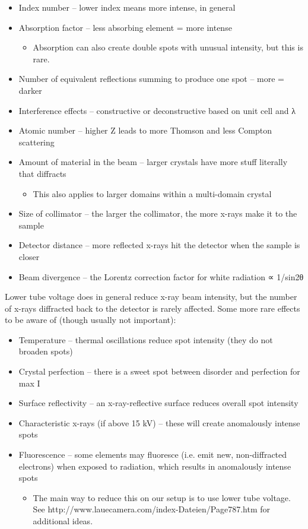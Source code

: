 \begin{itemize}
    \item Index number – lower index means more intense, in general
    \item Absorption factor – less absorbing element = more intense
    \begin{itemize}
        \item Absorption can also create double spots with unusual intensity, but this is rare.
        \end{itemize}
    \item Number of equivalent reflections summing to produce one spot – more = darker
    \item Interference effects – constructive or deconstructive based on unit cell and λ
    \item Atomic number – higher Z leads to more Thomson and less Compton scattering
    \item Amount of material in the beam – larger crystals have more stuff literally that diffracts
    \begin{itemize}
        \item This also applies to larger domains within a multi-domain crystal
        \end{itemize}
    \item Size of collimator – the larger the collimator, the more x-rays make it to the sample
    \item Detector distance – more reflected x-rays hit the detector when the sample is closer
    \item Beam divergence – the Lorentz correction factor for white radiation ∝ 1/sin2θ
\end{itemize}
Lower tube voltage does in general reduce x-ray beam intensity, but the number of x-rays diffracted back to the detector is rarely affected.
Some more rare effects to be aware of (though usually not important):
\begin{itemize}
    \item Temperature – thermal oscillations reduce spot intensity (they do not broaden spots)
    \item Crystal perfection – there is a sweet spot between disorder and perfection for max I
    \item Surface reflectivity – an x-ray-reflective surface reduces overall spot intensity
    \item Characteristic x-rays (if above 15 kV) – these will create anomalously intense spots
    \item Fluorescence – some elements may fluoresce (i.e. emit new, non-diffracted electrons) when exposed to radiation, which results in anomalously intense spots
    \begin{itemize}
        \item The main way to reduce this on our setup is to use lower tube voltage. See http://www.lauecamera.com/index-Dateien/Page787.htm for additional ideas.
        \end{itemize}
\end{itemize}
